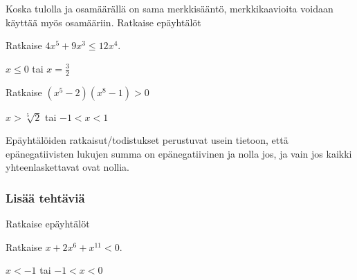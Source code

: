 \begin{tehtavasivu}
\begin{tehtava}
    Koska tulolla ja osamäärällä on sama merkkisääntö, merkkikaavioita
	voidaan käyttää myös osamääriin. Ratkaise epäyhtälöt
    \begin{vastaus}
    \end{vastaus}
\end{tehtava}


\begin{tehtava}
    Ratkaise $4x^5+9 x^3 \le 12 x^4$.
    \begin{vastaus}
        $x\le0$ tai $x=\frac{3}{2}$
    \end{vastaus}
\end{tehtava}

\begin{tehtava}
Ratkaise $(x^5-2)(x^8-1) >0$
\begin{vastaus}
$x > \sqrt[5]{2}$ tai $-1<x<1$
\end{vastaus}
\end{tehtava}

\begin{tehtava}
Epäyhtälöiden ratkaisut/todistukset perustuvat usein tietoon, että epänegatiivisten lukujen summa on epänegatiivinen ja nolla jos, ja vain jos kaikki yhteenlaskettavat ovat nollia.


\begin{vastaus}
\end{vastaus}
\end{tehtava}

\subsubsection*{Lisää tehtäviä}

\begin{tehtava} %
Ratkaise epäyhtälöt
    \begin{vastaus}
    \end{vastaus}
\end{tehtava}

\begin{tehtava}
    Ratkaise $x+2x^6+x^{11}<0$.
    \begin{vastaus}
        $x<-1$ tai $ -1<x<0$
    \end{vastaus}
\end{tehtava}

\end{tehtavasivu}